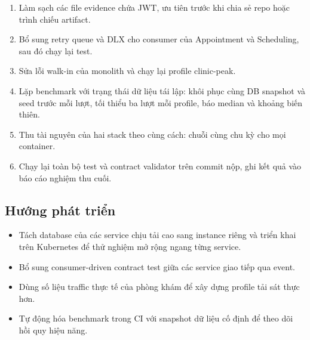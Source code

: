 \begin{enumerate}
  \item Làm sạch các file evidence chứa JWT, ưu tiên trước khi chia sẻ repo hoặc trình chiếu artifact.
  \item Bổ sung retry queue và DLX cho consumer của Appointment và Scheduling, sau đó chạy lại test.
  \item Sửa lỗi walk-in của monolith và chạy lại profile clinic-peak.
  \item Lặp benchmark với trạng thái dữ liệu tái lập: khôi phục cùng DB snapshot và seed trước mỗi lượt, tối thiểu ba lượt mỗi profile, báo median và khoảng biến thiên.
  \item Thu tài nguyên của hai stack theo cùng cách: chuỗi  cùng chu kỳ cho mọi container.
  \item Chạy lại toàn bộ test và contract validator trên commit nộp, ghi kết quả vào báo cáo nghiệm thu cuối.
\end{enumerate}

\subsection{Hướng phát triển}

\begin{itemize}
  \item Tách database của các service chịu tải cao sang instance riêng và triển khai trên Kubernetes để thử nghiệm mở rộng ngang từng service.
  \item Bổ sung consumer-driven contract test giữa các service giao tiếp qua event.
  \item Dùng số liệu traffic thực tế của phòng khám để xây dựng profile tải sát thực hơn.
  \item Tự động hóa benchmark trong CI với snapshot dữ liệu cố định để theo dõi hồi quy hiệu năng.
\end{itemize}
